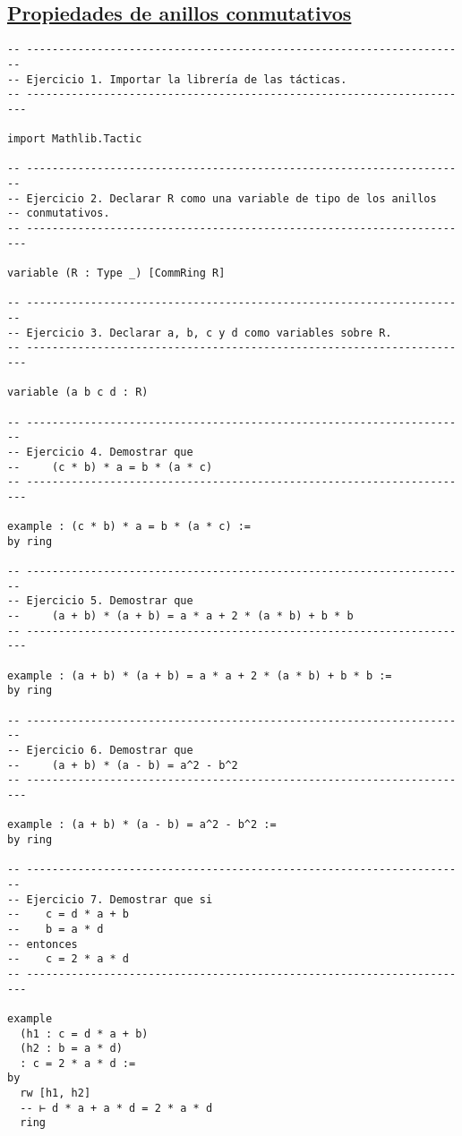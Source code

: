 \subsection{\href{./src/Basicos/Propiedades\_de\_anillos\_conmutativos.lean}{Propiedades de anillos conmutativos}}
\label{sec:org66babdc}
\begin{verbatim}
-- ---------------------------------------------------------------------
-- Ejercicio 1. Importar la librería de las tácticas.
-- ----------------------------------------------------------------------

import Mathlib.Tactic

-- ---------------------------------------------------------------------
-- Ejercicio 2. Declarar R como una variable de tipo de los anillos
-- conmutativos.
-- ----------------------------------------------------------------------

variable (R : Type _) [CommRing R]

-- ---------------------------------------------------------------------
-- Ejercicio 3. Declarar a, b, c y d como variables sobre R.
-- ----------------------------------------------------------------------

variable (a b c d : R)

-- ---------------------------------------------------------------------
-- Ejercicio 4. Demostrar que
--     (c * b) * a = b * (a * c)
-- ----------------------------------------------------------------------

example : (c * b) * a = b * (a * c) :=
by ring

-- ---------------------------------------------------------------------
-- Ejercicio 5. Demostrar que
--     (a + b) * (a + b) = a * a + 2 * (a * b) + b * b
-- ----------------------------------------------------------------------

example : (a + b) * (a + b) = a * a + 2 * (a * b) + b * b :=
by ring

-- ---------------------------------------------------------------------
-- Ejercicio 6. Demostrar que
--     (a + b) * (a - b) = a^2 - b^2
-- ----------------------------------------------------------------------

example : (a + b) * (a - b) = a^2 - b^2 :=
by ring

-- ---------------------------------------------------------------------
-- Ejercicio 7. Demostrar que si
--    c = d * a + b
--    b = a * d
-- entonces
--    c = 2 * a * d
-- ----------------------------------------------------------------------

example
  (h1 : c = d * a + b)
  (h2 : b = a * d)
  : c = 2 * a * d :=
by
  rw [h1, h2]
  -- ⊢ d * a + a * d = 2 * a * d
  ring
\end{verbatim}

